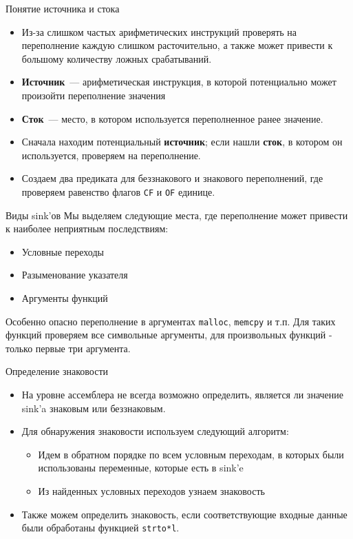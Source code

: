\documentclass[10pt]{beamer}
\begin{document}
\begin{frame}{Понятие источника и стока}
\begin{itemize}
    \item Из-за слишком частых арифметических инструкций проверять на
        переполнение каждую слишком расточительно, а также может привести к
        большому количеству ложных срабатываний.
    \item \textbf{Источник}~--- арифметическая инструкция, в которой потенциально
        может произойти переполнение значения
    \item \textbf{Сток}~--- место, в котором используется переполненное ранее
        значение.
    \item Сначала находим потенциальный \textbf{источник}; если нашли
        \textbf{сток}, в котором он используется, проверяем на переполнение.
    \item Создаем два предиката для беззнакового и знакового переполнений, где
        проверяем равенство флагов \texttt{CF} и \texttt{OF} единице.
\end{itemize}
\end{frame}

\begin{frame}{Виды sink'ов}
    Мы выделяем следующие места, где переполнение может привести к наиболее
    неприятным последствиям:
    \begin{itemize}
        \item Условные переходы
        \item Разыменование указателя
        \item Аргументы функций
    \end{itemize}
    Особенно опасно переполнение в аргументах \texttt{malloc}, \texttt{memcpy} и
    т.п.
    Для таких функций проверяем все символьные аргументы, для произвольных функций -
    только первые три аргумента.
\end{frame}

\begin{frame}{Определение знаковости}
\begin{itemize}
    \item На уровне ассемблера не всегда возможно определить, является ли
        значение sink'a знаковым или беззнаковым.
    \item Для обнаружения знаковости используем следующий алгоритм:
    \begin{itemize}
        \item Идем в обратном порядке по всем условным переходам, в которых были использованы
            переменные, которые есть в sink'e
        \item Из найденных условных переходов узнаем знаковость
    \end{itemize}
    \item Также можем определить знаковость, если соответствующие входные данные
        были обработаны функцией \texttt{strto*l}.
\end{itemize}
\end{frame}
\end{document}
